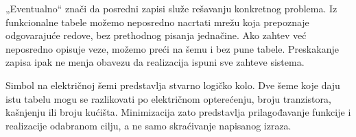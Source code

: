
„Eventualno“ znači da posredni zapisi služe rešavanju konkretnog problema. Iz funkcionalne tabele možemo neposredno nacrtati mrežu koja prepoznaje odgovarajuće redove, bez prethodnog pisanja jednačine. Ako zahtev već neposredno opisuje veze, možemo preći na šemu i bez pune tabele. Preskakanje zapisa ipak ne menja obavezu da realizacija ispuni sve zahteve sistema.

Simbol na električnoj šemi predstavlja stvarno logičko kolo. Dve šeme koje daju istu tabelu mogu se razlikovati po električnom opterećenju, broju tranzistora, kašnjenju ili broju kućišta. Minimizacija zato predstavlja prilagođavanje funkcije i realizacije odabranom cilju, a ne samo skraćivanje napisanog izraza.
